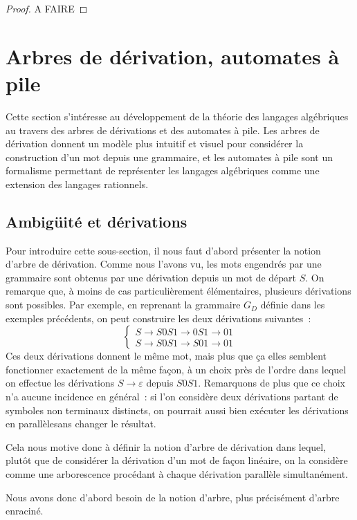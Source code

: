 \begin{proof}
  A FAIRE
\end{proof}

\section{Arbres de dérivation, automates à pile}

Cette section s'intéresse au développement de la théorie des langages
algébriques au travers des arbres de dérivations et des automates à pile. Les
arbres de dérivation donnent un modèle plus intuitif et visuel pour considérer
la construction d'un mot depuis une grammaire, et les automates à pile sont un
formalisme permettant de représenter les langages algébriques comme une
extension des langages rationnels.

\subsection{Ambigüité et dérivations}

Pour introduire cette sous-section, il nous faut d'abord présenter la notion
d'arbre de dérivation. Comme nous l'avons vu, les mots engendrés par une
grammaire sont obtenus par une dérivation depuis un mot de départ $S$. On
remarque que, à moins de cas particulièrement élémentaires, plusieurs
dérivations sont possibles. Par exemple, en reprenant la grammaire $G_D$
définie dans les exemples précédents, on peut construire les deux dérivations
suivantes~:
\[\begin{cases}
S \to S0S1 \to 0S1 \to 01\\
S \to S0S1 \to S01 \to 01
\end{cases}\]
Ces deux dérivations donnent le même mot, mais plus que ça elles semblent
fonctionner exactement de la même façon, à un choix près de l'ordre dans
lequel on effectue les dérivations $S \to \varepsilon$ depuis $S0S1$. Remarquons
de plus que ce choix n'a aucune incidence en général~: si l'on considère deux
dérivations partant de symboles non terminaux distincts, on pourrait aussi bien
exécuter les dérivations \og en parallèle\fg sans changer le résultat.

Cela nous motive donc à définir la notion d'arbre de dérivation dans lequel,
plutôt que de considérer la dérivation d'un mot de façon linéaire, on la
considère comme une arborescence procédant à chaque dérivation parallèle
simultanément.

Nous avons donc d'abord besoin de la notion d'arbre, plus précisément
d'arbre enraciné.

